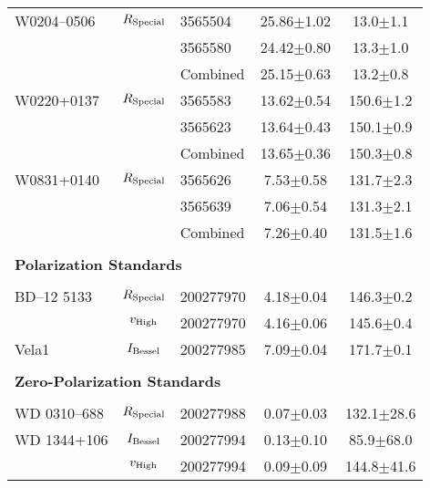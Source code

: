 \begin{table}
\begin{tabular}{lclcc}
        W0204--0506  & $R_{\rm Special}$ & 3565504   &           25.86$\pm$1.02 & \phantom{0}13.0$\pm$1.1 \\
                     &                   & 3565580   &           24.42$\pm$0.80 & \phantom{0}13.3$\pm$1.0 \\
                     &                   & Combined  &           25.15$\pm$0.63 & \phantom{0}13.2$\pm$0.8 \\
        W0220+0137   & $R_{\rm Special}$ & 3565583   &           13.62$\pm$0.54 &           150.6$\pm$1.2 \\
                     &                   & 3565623   &           13.64$\pm$0.43 &           150.1$\pm$0.9 \\
                     &                   & Combined  &           13.65$\pm$0.36 &           150.3$\pm$0.8 \\
        W0831+0140   & $R_{\rm Special}$ & 3565626   & \phantom{0}7.53$\pm$0.58 &           131.7$\pm$2.3 \\
                     &                   & 3565639   & \phantom{0}7.06$\pm$0.54 &           131.3$\pm$2.1 \\
                     &                   & Combined  & \phantom{0}7.26$\pm$0.40 &           131.5$\pm$1.6 \\
        \\
        \multicolumn{5}{l}{\bf{Polarization Standards}}\\\\
        BD--12 5133  & $R_{\rm Special}$ & 200277970 & \phantom{0}4.18$\pm$0.04 &           146.3$\pm$0.2 \\
                     & $v_{\rm High}$    & 200277970 & \phantom{0}4.16$\pm$0.06 &           145.6$\pm$0.4 \\
        Vela1        & $I_{\rm Bessel}$  & 200277985 & \phantom{0}7.09$\pm$0.04 &           171.7$\pm$0.1 \\
        \\
        \multicolumn{5}{l}{\bf{Zero-Polarization Standards}}\\\\
        WD 0310--688 & $R_{\rm Special}$ & 200277988 & \phantom{0}0.07$\pm$0.03 &          132.1$\pm$28.6 \\
        WD 1344+106  & $I_{\rm Bessel}$  & 200277994 & \phantom{0}0.13$\pm$0.10 & \phantom{0}85.9$\pm$68.0 \\
                     & $v_{\rm High}$    & 200277994 & \phantom{0}0.09$\pm$0.09 &          144.8$\pm$41.6 \\

\end{tabular}
\end{table}
